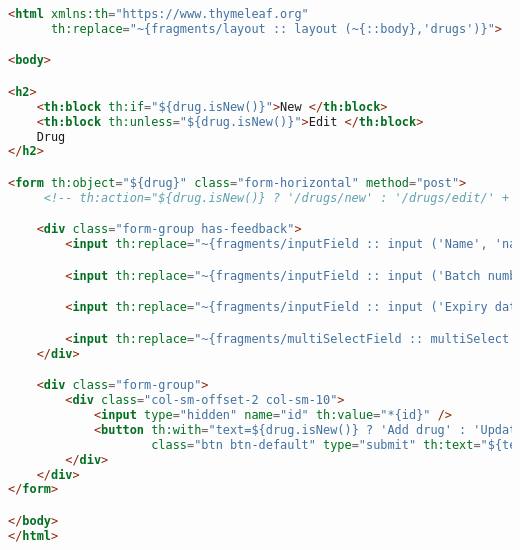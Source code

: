 \documentclass[12pt, a4paper]{article}
\begin{document}
\begin{lstlisting}[language=HTML, title='addOrUpdateDrug.html']
<html xmlns:th="https://www.thymeleaf.org"
      th:replace="~{fragments/layout :: layout (~{::body},'drugs')}">

<body>

<h2>
    <th:block th:if="${drug.isNew()}">New </th:block>
    <th:block th:unless="${drug.isNew()}">Edit </th:block>
    Drug
</h2>

<form th:object="${drug}" class="form-horizontal" method="post">
     <!-- th:action="${drug.isNew()} ? '/drugs/new' : '/drugs/edit/' + ${drug.getId()}" -->

    <div class="form-group has-feedback">
        <input th:replace="~{fragments/inputField :: input ('Name', 'name', 'text')}" />

        <input th:replace="~{fragments/inputField :: input ('Batch number', 'batchNumber', 'text')}" />

        <input th:replace="~{fragments/inputField :: input ('Expiry date', 'expiryDate', 'date')}" />

        <input th:replace="~{fragments/multiSelectField :: multiSelect ('Pet types', 'petTypes', ${allPetTypes})}" />
    </div>

    <div class="form-group">
        <div class="col-sm-offset-2 col-sm-10">
            <input type="hidden" name="id" th:value="*{id}" />
            <button th:with="text=${drug.isNew()} ? 'Add drug' : 'Update drug'"
                    class="btn btn-default" type="submit" th:text="${text}"></button>
        </div>
    </div>
</form>

</body>
</html>
\end{lstlisting}
\end{document}
